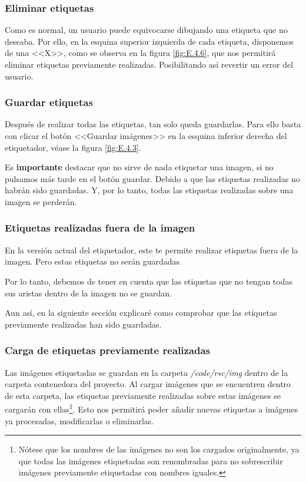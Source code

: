 \subsubsection{Eliminar etiquetas}

Como es normal, un usuario puede equivocarse dibujando una etiqueta que no deseaba. Por ello, en la esquina superior izquierda de cada etiqueta, disponemos de una \textrm{<<X>>}, como se observa en la figura \ref{fig:E.4.6}, que nos permitirá eliminar etiquetas previamente realizadas. Posibilitando así revertir un error del usuario.

\subsubsection{Guardar etiquetas}

Después de realizar todas las etiquetas, tan solo queda guardarlas. Para ello basta con clicar el botón \textrm{<<Guardar imágenes>>} en la esquina inferior derecha del etiquetador, véase la figura \ref{fig:E.4.3}.

Es \textbf{importante} destacar que no sirve de nada etiquetar una imagen, si no pulsamos más tarde en el botón guardar. Debido a que las etiquetas realizadas no habrán sido guardadas. Y, por lo tanto, todas las etiquetas realizadas sobre una imagen se perderán.

\subsubsection{Etiquetas realizadas fuera de la imagen}

En la versión actual del etiquetador, este te permite realizar etiquetas fuera de la imagen. Pero estas etiquetas no serán guardadas.

Por lo tanto, debemos de tener en cuenta que las etiquetas que no tengan todas sus aristas dentro de la imagen no se guardan.

Aun así, en la siguiente sección explicaré como comprobar que las etiquetas previamente realizadas han sido guardadas.

\subsubsection{Carga de etiquetas previamente realizadas}

Las imágenes etiquetadas se guardan en la carpeta \textit{/code/rsc/img} dentro de la carpeta contenedora del proyecto. Al cargar imágenes que se encuentren dentro de esta carpeta, las etiquetas previamente realizadas sobre estas imágenes se cargarán con ellas\footnote{Nótese que los nombres de las imágenes no son los cargados originalmente, ya que todas las imágenes etiquetadas son renombradas para no sobrescribir imágenes previamente etiquetadas con nombres iguales.}. Esto nos permitirá poder añadir nuevas etiquetas a imágenes ya procesadas, modificarlas o eliminarlas.

